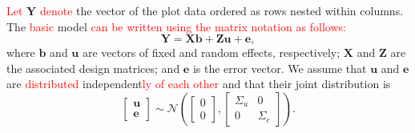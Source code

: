 \documentclass[a4paper]{article} 	%
\newcommand{\N}{\mathcal{N}}
\newcommand{\revision}[1]{\textcolor{red}{#1}}
\begin{document}
\revision{Let} $\bm{Y}$ \revision{denote} the vector of the plot data ordered as rows nested within columns. The \revision{basic} model \revision{can be written using the matrix notation as follows:}
\begin{equation}\label{eq:modelmatrix}
	\bm{Y} = \bm{X}\bm{b}+\bm{Z}\bm{u}+\bm{e},
\end{equation}
where $\bm{b}$ and $\bm{u}$ are vectors of fixed and random effects, respectively; $\bm{X}$ and $\bm{Z}$ are the associated design matrices; and $\bm{e}$ is the error vector. We assume that $\bm{u}$ and $\bm{e}$ are \revision{distributed} independent\revision{ly} \revision{of each other} and that their joint distribution is 
\begin{equation}\label{eq:covariance}
	\begin{bmatrix}
		\bm{u} \\ \bm{e}
	\end{bmatrix} \sim \N\left( \begin{bmatrix}
		0\\0 \end{bmatrix}, \begin{bmatrix}
		\Sigma_u & 0 \\ 0 & \Sigma_e
	\end{bmatrix}\right). 
\end{equation}
	

	
\end{document}
